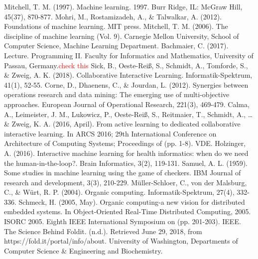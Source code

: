 \documentclass[conference,compsoc]{IEEEtran}
\newcommand\notes[1]{\textcolor{red}{#1}}
\begin{document}
\begin{thebibliography}{1}
    Mitchell, T. M. (1997). Machine learning. 1997. Burr Ridge, IL: McGraw Hill, 45(37), 870-877.
    Mohri, M., Rostamizadeh, A., \& Talwalkar, A. (2012). Foundations of machine learning. MIT press.
    Mitchell, T. M. (2006). The discipline of machine learning (Vol. 9). Carnegie Mellon University, School of Computer Science, Machine Learning Department.
    Bachmaier, C. (2017). Lecture. Programming II\@. Faculty for Informatics and Mathematics, University of Passau, Germany.\notes{check this}
    Sick, B., Oeste-Rei{\ss}, S., Schmidt, A., Tomforde, S., \& Zweig, A. K. (2018). Collaborative Interactive Learning. Informatik-Spektrum, 41(1), 52-55.
    Corne, D., Dhaenens, C., \& Jourdan, L. (2012). Synergies between operations research and data mining: The emerging use of multi-objective approaches. European Journal of Operational Research, 221(3), 469-479.
    Calma, A., Leimeister, J. M., Lukowicz, P., Oeste-Rei{\ss}, S., Reitmaier, T., Schmidt, A., \dots \& Zweig, K. A. (2016, April). From active learning to dedicated collaborative interactive learning. In ARCS 2016; 29th International Conference on Architecture of Computing Systems; Proceedings of (pp. 1-8). VDE.
    Holzinger, A. (2016). Interactive machine learning for health informatics: when do we need the human-in-the-loop?. Brain Informatics, 3(2), 119-131.
    Samuel, A. L. (1959). Some studies in machine learning using the game of checkers. IBM Journal of research and development, 3(3), 210-229.
    M{\"u}ller-Schloer, C., von der Malsburg, C., \& W{\"u}rt, R. P. (2004). Organic computing. Informatik-Spektrum, 27(4), 332-336.
    Schmeck, H. (2005, May). Organic computing-a new vision for distributed embedded systems. In Object-Oriented Real-Time Distributed Computing, 2005. ISORC 2005. Eighth IEEE International Symposium on (pp. 201-203). IEEE.
    The Science Behind Foldit. (n.d.). Retrieved June 29, 2018, from https://fold.it/portal/info/about. University of Washington, Departments of Computer Science \& Engineering and Biochemistry.
\end{thebibliography}
\end{document}
